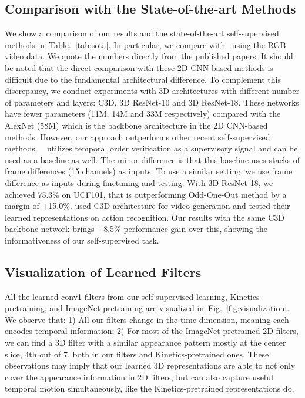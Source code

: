 \documentclass[letterpaper]{article} \usepackage{aaai19}  \usepackage{times}  \usepackage{helvet}  \usepackage{courier}  \usepackage{url}  \usepackage{graphicx}  \frenchspacing  \setlength{\pdfpagewidth}{8.5in}  \setlength{\pdfpageheight}{11in}
\newcommand{\figref}[1]{Fig.~\ref{#1}}
\newcommand{\tabref}[1]{Table.~\ref{#1}}
\begin{document}
\subsection{Comparison with the State-of-the-art Methods}
We show a comparison of our results and the state-of-the-art self-supervised methods in~\tabref{tab:sota}. In particular, we compare with~\cite{mobahi2009deep,wang2015unsupervised,misra2016shuffle,lee2017unsupervised,gan2018geometry,wei2018learning} using the RGB video data. We quote the numbers directly from the published papers. It should be noted that the direct comparison with these 2D CNN-based methods is difficult due to the fundamental architectural difference. To complement this discrepancy, we conduct experiments with 3D architectures with different number of parameters and layers: C3D, 3D ResNet-10 and 3D ResNet-18. These networks have fewer parameters (11M, 14M and 33M respectively) compared with the AlexNet (58M) which is the backbone architecture in the 2D CNN-based methods. However, our approach outperforms other recent self-supervised methods. 
~\cite{fernando2017self} utilizes temporal order verification as a supervisory signal and can be used as a baseline as well. The minor difference is that this baseline uses stacks of frame differences (15 channels) as inputs. To use a similar setting, we use frame difference as inputs during finetuning and testing. With 3D ResNet-18, we achieved 75.3\% on UCF101, that is outperforming Odd-One-Out method by a margin of +15.0\%. \cite{vondrick2016generating} used C3D architecture for video generation and tested their learned representations on action recognition. Our results with the same C3D backbone network brings +8.5\% performance gain over this, showing the informativeness of our self-supervised task.


\subsection{Visualization of Learned Filters}
All the learned conv1 filters from our self-supervised learning, Kinetics-pretraining, and ImageNet-pretraining are visualized in~\figref{fig:visualization}. We observe that: 1) All our filters change in the time dimension, meaning each encodes temporal information; 2) For most of the ImageNet-pretrained 2D filters, we can find a 3D filter with a similar appearance pattern mostly at the center slice, 4th out of 7, both in our filters and Kinetics-pretrained ones. These observations may imply that our learned 3D representations are able to not only cover the appearance information in 2D filters, but can also capture useful temporal motion simultaneously, like the Kinetics-pretrained representations do. 
\end{document}
